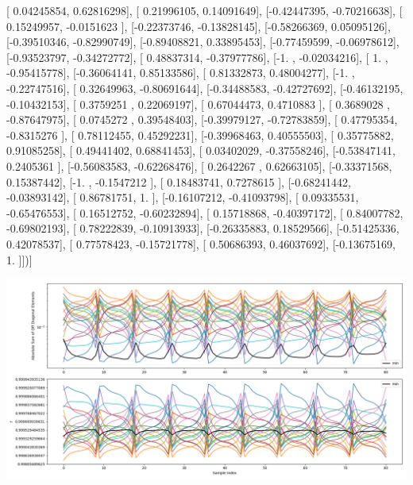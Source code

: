 \documentclass{article}
\begin{document}
       [ 0.04245854,  0.62816298],
       [ 0.21996105,  0.14091649],
       [-0.42447395, -0.70216638],
       [ 0.15249957, -0.0151623 ],
       [-0.22373746, -0.13828145],
       [-0.58266369,  0.05095126],
       [-0.39510346, -0.82990749],
       [-0.89408821,  0.33895453],
       [-0.77459599, -0.06978612],
       [-0.93523797, -0.34272772],
       [ 0.48837314, -0.37977786],
       [-1.        , -0.02034216],
       [ 1.        , -0.95415778],
       [-0.36064141,  0.85133586],
       [ 0.81332873,  0.48004277],
       [-1.        , -0.22747516],
       [ 0.32649963, -0.80691644],
       [-0.34488583, -0.42727692],
       [-0.46132195, -0.10432153],
       [ 0.3759251 ,  0.22069197],
       [ 0.67044473,  0.4710883 ],
       [ 0.3689028 , -0.87647975],
       [ 0.0745272 ,  0.39548403],
       [-0.39979127, -0.72783859],
       [ 0.47795354, -0.8315276 ],
       [ 0.78112455,  0.45292231],
       [-0.39968463,  0.40555503],
       [ 0.35775882,  0.91085258],
       [ 0.49441402,  0.68841453],
       [ 0.03402029, -0.37558246],
       [-0.53847141,  0.2405361 ],
       [-0.56083583, -0.62268476],
       [ 0.2642267 ,  0.62663105],
       [-0.33371568,  0.15387442],
       [-1.        , -0.1547212 ],
       [ 0.18483741,  0.7278615 ],
       [-0.68241442, -0.03893142],
       [ 0.86781751,  1.        ],
       [-0.16107212, -0.41093798],
       [ 0.09335531, -0.65476553],
       [ 0.16512752, -0.60232894],
       [ 0.15718868, -0.40397172],
       [ 0.84007782, -0.69802193],
       [ 0.78222839, -0.10913933],
       [-0.26335883,  0.18529566],
       [-0.51425336,  0.42078537],
       [ 0.77578423, -0.15721778],
       [ 0.50686393,  0.46037692],
       [-0.13675169,  1.        ]])]
\begin{center}
\includegraphics[scale=.9]{report_pickled_controls227/control_dpn_all.png}

\end{center}
\end{document}
